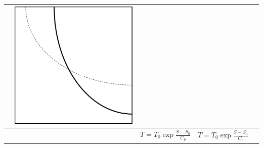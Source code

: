 \begin{table}[!h]
\begin{center}
\begin{tabular}{|r|c|c|c|c|}
     & \includegraphics[scale=0.25]{isentropiquepv.png}\\


     \hline

     &
  & $T = T_0 \exp{\frac{S-S_0}{C_p}}$
  & $T = T_0 \exp{\frac{S-S_0}{C_v}}$
  &
  \\


\end{tabular}
\end{center}
\end{table}
